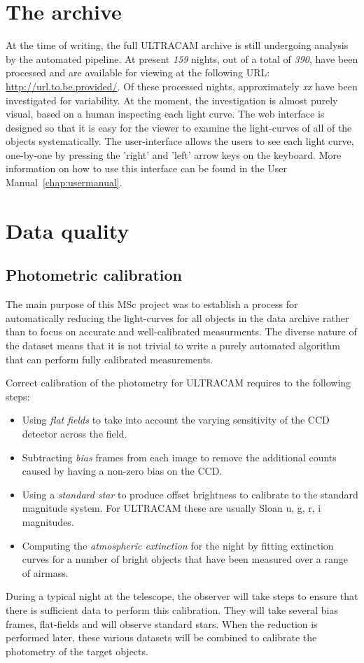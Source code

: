 \section{The archive} 

At the time of writing, the full ULTRACAM archive is still undergoing analysis by the automated pipeline. At present \emph{159} nights, out of a total of \emph{390}, have been processed and are available for viewing at the following URL: \url{http://url.to.be.provided/}. Of these processed nights, approximately \emph{xx} have been investigated for variability. At the moment, the investigation is almost purely visual, based on a human inspecting each light curve. The web interface is designed so that it is easy for the viewer to examine the light-curves of all of the objects systematically. The user-interface allows the users to see each light curve, one-by-one by pressing the 'right' and 'left'  arrow keys on the keyboard. More information on how to use this interface can be found in the User Manual~\ref{chap:usermanual}. 

\section{Data quality}

\subsection{Photometric calibration}
The main purpose of this MSc project was to establish a process for automatically reducing the light-curves for all objects in the data archive rather than to focus on accurate and well-calibrated measurments. The diverse nature of the dataset means that it is not trivial to write a purely automated algorithm that can perform fully calibrated measurements. 

Correct calibration of the photometry for ULTRACAM requires to the following steps:
\begin{itemize}
  \item Using \emph{flat fields} to take into account the varying sensitivity of the CCD detector across the field. 
  \item Subtracting \emph{bias} frames from each image to remove the additional counts caused by having a non-zero bias on the CCD. 
  \item Using a \emph{standard star} to produce offset brightness to calibrate to the standard magnitude system. For ULTRACAM these are usually Sloan u, g, r, i magnitudes.
  \item Computing the \emph{atmospheric extinction} for the night by fitting extinction curves for a number of bright objects that have been measured over a range of airmass. 
\end{itemize}
During a typical night at the telescope, the observer will take steps to ensure that there is sufficient data to perform this calibration. They will take several bias frames, flat-fields and will observe standard stars. When the reduction is performed later, these various datasets will be combined to calibrate the photometry of the target objects. 

